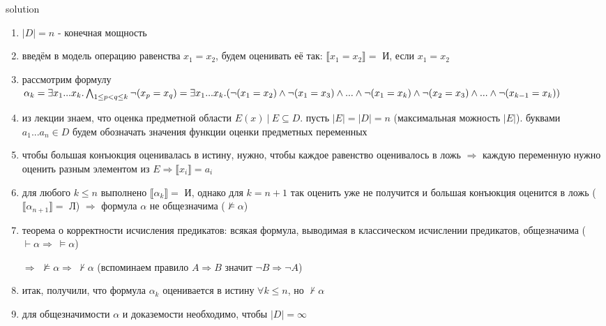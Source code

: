 \documentclass[12pt]{article}
\begin{document}
solution

\begin{enumerate}
    \item $|D|=n$ - конечная мощность
    
    \item введём в модель операцию равенства $x_1=x_2$, будем оценивать её так: $\llbracket x_1=x_2 \rrbracket=$ И, если $x_1=x_2$
    
    \item рассмотрим формулу $\alpha_k=\exists x_1...x_k.
\bigwedge_{1\leq p < q \leq k}\neg(x_p=x_q)\\
=\exists x_1...x_k.(
\neg(x_1=x_2)\wedge\neg(x_1=x_3)\wedge...\wedge\neg(x_1=x_k)\wedge\neg(x_2=x_3)\wedge...\wedge\neg(x_{k-1}=x_k))$

    \item из лекции знаем, что оценка предметной области $E(x)\ |\ E\subseteq D$. пусть $|E|=|D|=n$ (максимальная можность $|E|$). буквами $a_1...a_n\in D$ будем обозначать значения функции оценки предметных переменных

    \item чтобы большая конъюкция оценивалась в истину, нужно, чтобы каждое равенство оценивалось в ложь $\Rightarrow$ каждую переменную нужно оценить разным элементом из $E\Rightarrow \llbracket x_i \rrbracket = a_i$
    
    \item для любого $k\leq n$ выполнено $\llbracket\alpha_k\rrbracket=$ И, однако для $k=n+1$ так оценить уже не получится и большая конъюкция оценится в ложь ($\llbracket\alpha_{n+1}\rrbracket=$ Л) $\Rightarrow$ формула $\alpha$ не общезначима ($\not\models \alpha$)

    \item теорема о корректности исчисления предикатов: всякая формула, выводимая в классическом исчислении предикатов, общезначима ($\vdash \alpha \Rightarrow\ \models \alpha $)

    $\Rightarrow$ $\not\models \alpha \Rightarrow\ \not\vdash \alpha$ (вспоминаем правило $A\Rightarrow B$ значит $\neg B \Rightarrow \neg A$)

    \item итак, получили, что формула $\alpha_k$ оценивается в истину $\forall k \le n$, но $\not\vdash \alpha$

    \item для общезначимости $\alpha$ и доказемости необходимо, чтобы $|D|=\infty$

\end{enumerate}
\end{document}
